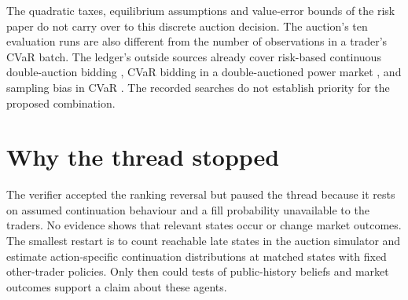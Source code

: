 \documentclass{article}
\begin{document}
The quadratic taxes, equilibrium assumptions and value-error bounds of the risk paper do not carry
over to this discrete auction decision. The auction's ten evaluation runs are also different from
the number of observations in a trader's CVaR batch. The ledger's outside sources already cover
risk-based continuous double-auction bidding \cite{Vytelingum2004}, CVaR bidding in a
double-auctioned power market \cite{Panda2019}, and sampling bias in CVaR \cite{Tamar2015}. The
recorded searches do not establish priority for the proposed combination.

\section{Why the thread stopped}

The verifier accepted the ranking reversal but paused the thread because it rests on assumed
continuation behaviour and a fill probability unavailable to the traders. No evidence shows that
relevant states occur or change market outcomes. The smallest restart is to count reachable late
states in the auction simulator and estimate action-specific continuation distributions at matched
states with fixed other-trader policies. Only then could tests of public-history beliefs and market
outcomes support a claim about these agents.



\end{document}
